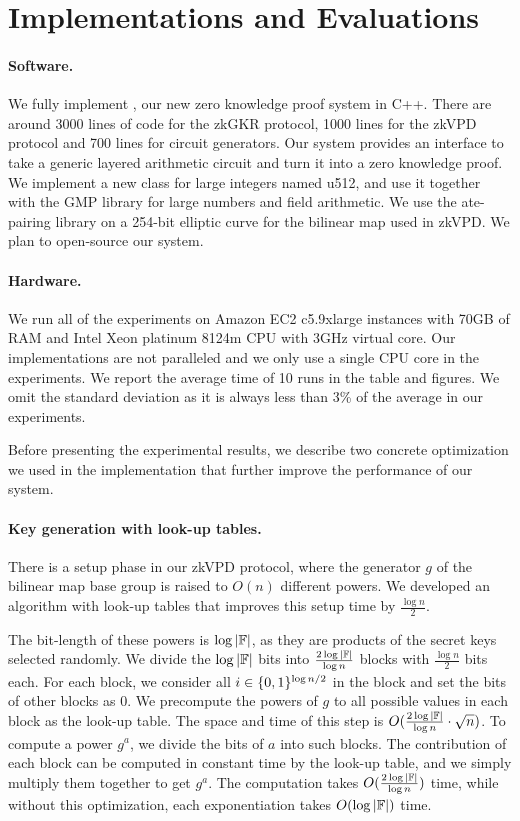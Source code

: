 
\section{Implementations and Evaluations}\label{sec:eval}

\paragraph{Software.} We fully implement \name, our new zero knowledge proof system in C++. There are around 3000 lines of code for the zkGKR protocol, 1000 lines for the zkVPD protocol and 700 lines for circuit generators. Our system provides an interface to take a generic layered arithmetic circuit and turn it into a zero knowledge proof. We implement a new class for large integers named u512, and use it together with the GMP\cite{GNU} library for large numbers and field arithmetic. We use the ate-pairing\cite{ate-pairing} library on a 254-bit elliptic curve for the bilinear map used in zkVPD. We plan to open-source our system.

\paragraph{Hardware.} We run all of the experiments on Amazon EC2 c5.9xlarge instances with 70GB of RAM and Intel Xeon platinum 8124m CPU with 3GHz virtual core. Our implementations are not paralleled and we only use a single CPU core in the experiments. We report the average time of 10 runs in the table and figures. We omit the standard deviation as it is always less than 3\% of the average in our experiments.


Before presenting the experimental results, we describe two concrete optimization we used in the implementation that further improve the performance of our system.

\paragraph{Key generation with look-up tables.} There is a setup phase in our zkVPD protocol, where the generator $g$ of the bilinear map base group is raised to $O(n)$ different powers. We developed an algorithm with look-up tables that improves this setup time by $\frac{\log n}{2}$. 

The bit-length of these powers is $\log |\mathbb{F}|$, as they are products of the secret keys selected randomly. We divide the $\log|\mathbb{F}|$ bits into $\frac{2\log|\mathbb{F}|}{\log n}$ blocks with $\frac{\log n}{2}$ bits each. For each block, we consider all $i\in\{0,1\}^{\log n/2}$ in the block and set the bits of other blocks as 0. We precompute the powers of $g$ to all possible values in each block as the look-up table. The space and time of this step is $O(\frac{2\log|\mathbb{F}|}{\log n}\cdot\sqrt{n})$. To compute a power $g^a$, we divide the bits of $a$ into such blocks. The contribution of each block can be computed in constant time by the look-up table, and we simply multiply them together to get $g^a$. The computation takes $O(\frac{2\log|\mathbb{F}|}{\log n})$ time, while without this optimization, each exponentiation takes $O(\log |\mathbb{F}|)$ time.

